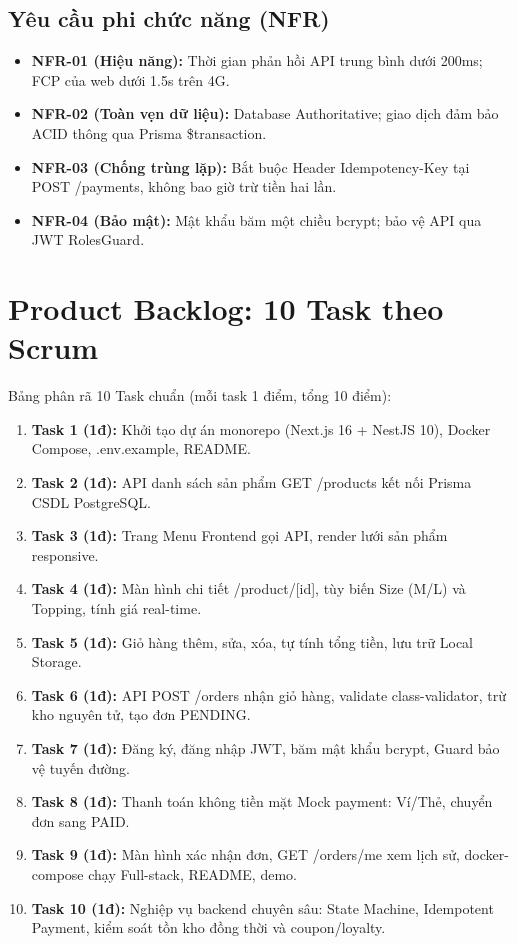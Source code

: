 \documentclass[a4paper]{article}
\begin{document}
\subsection{Yêu cầu phi chức năng (NFR)}
\begin{itemize}
    \item \textbf{NFR-01 (Hiệu năng):} Thời gian phản hồi API trung bình dưới 200ms; FCP của web dưới 1.5s trên 4G.
    \item \textbf{NFR-02 (Toàn vẹn dữ liệu):} Database Authoritative; giao dịch đảm bảo ACID thông qua Prisma \$transaction.
    \item \textbf{NFR-03 (Chống trùng lặp):} Bắt buộc Header Idempotency-Key tại POST /payments, không bao giờ trừ tiền hai lần.
    \item \textbf{NFR-04 (Bảo mật):} Mật khẩu băm một chiều bcrypt; bảo vệ API qua JWT RolesGuard.
\end{itemize}

\section{Product Backlog: 10 Task theo Scrum}
Bảng phân rã 10 Task chuẩn (mỗi task 1 điểm, tổng 10 điểm):
\begin{enumerate}
    \item \textbf{Task 1 (1đ):} Khởi tạo dự án monorepo (Next.js 16 + NestJS 10), Docker Compose, .env.example, README.
    \item \textbf{Task 2 (1đ):} API danh sách sản phẩm GET /products kết nối Prisma CSDL PostgreSQL.
    \item \textbf{Task 3 (1đ):} Trang Menu Frontend gọi API, render lưới sản phẩm responsive.
    \item \textbf{Task 4 (1đ):} Màn hình chi tiết /product/[id], tùy biến Size (M/L) và Topping, tính giá real-time.
    \item \textbf{Task 5 (1đ):} Giỏ hàng thêm, sửa, xóa, tự tính tổng tiền, lưu trữ Local Storage.
    \item \textbf{Task 6 (1đ):} API POST /orders nhận giỏ hàng, validate class-validator, trừ kho nguyên tử, tạo đơn PENDING.
    \item \textbf{Task 7 (1đ):} Đăng ký, đăng nhập JWT, băm mật khẩu bcrypt, Guard bảo vệ tuyến đường.
    \item \textbf{Task 8 (1đ):} Thanh toán không tiền mặt Mock payment: Ví/Thẻ, chuyển đơn sang PAID.
    \item \textbf{Task 9 (1đ):} Màn hình xác nhận đơn, GET /orders/me xem lịch sử, docker-compose chạy Full-stack, README, demo.
    \item \textbf{Task 10 (1đ):} Nghiệp vụ backend chuyên sâu: State Machine, Idempotent Payment, kiểm soát tồn kho đồng thời và coupon/loyalty.
\end{enumerate}
\end{document}
